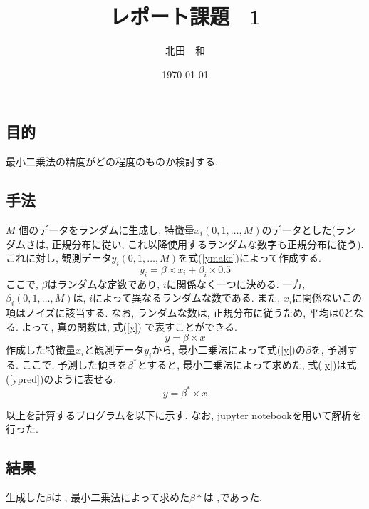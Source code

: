 \documentclass{jsarticle}
\title{レポート課題　1}
\date{\today}
\author{北田　和}
\begin{document}
\maketitle
\newpage


\section{}

\subsection{目的}
最小二乗法の精度がどの程度のものか検討する. 

\subsection{手法}
$M$ 個のデータをランダムに生成し, 特徴量$x_i(0, 1, \dots, M)$のデータとした(ランダムさは, 正規分布に従い, これ以降使用するランダムな数字も正規分布に従う). 
これに対し, 観測データ$y_i(0, 1, \dots, M)$を式(\ref{ymake})によって作成する.
\begin{equation}
\label{ymake}
y_i = \beta \times x_i + \beta_i \times 0.5
\end{equation}
ここで, $\beta$はランダムな定数であり, $i$に関係なく一つに決める. 
一方, $\beta_i(0, 1, \dots, M)$は, $i$によって異なるランダムな数である. 
また, $x_i$に関係ないこの項はノイズに該当する. 
なお, ランダムな数は, 正規分布に従うため, 平均は0となる. 
よって, 真の関数は, 式(\ref{y}) で表すことができる. 
\begin{equation}
\label{y}
y = \beta \times x
\end{equation}
作成した特徴量$x_i$と観測データ$y_i$から, 最小二乗法によって式(\ref{y})の$\beta$を, 予測する. 
ここで, 予測した傾きを$\beta^*$とすると, 最小二乗法によって求めた, 式(\ref{y})は式(\ref{ypred})のように表せる. 
\begin{equation}
\label{ypred}
y = \beta^* \times x 
\end{equation}


以上を計算するプログラムを以下に示す.
なお, jupyter notebookを用いて解析を行った. 





\subsection{結果}
生成した$\beta$は   , 
最小二乗法によって求めた$\beta *$は    ,であった. 
\end{document}
